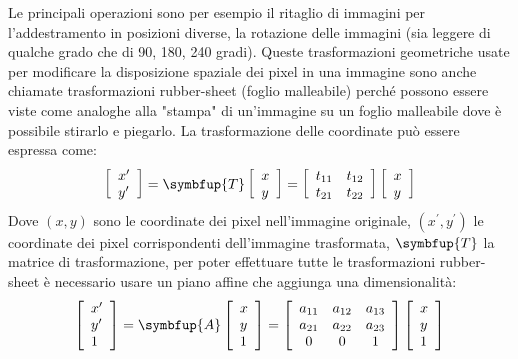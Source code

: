 Le principali operazioni sono per esempio  il ritaglio di immagini
per l'addestramento in posizioni diverse, la rotazione delle immagini (sia leggere di qualche grado che di 90, 180, 240 gradi). Queste trasformazioni geometriche usate per modificare la disposizione spaziale dei pixel in una 
immagine sono anche chiamate trasformazioni rubber-sheet (foglio malleabile) perché 
possono essere viste come analoghe alla "stampa" di un'immagine su un foglio malleabile dove è possibile stirarlo e piegarlo. La trasformazione delle coordinate può essere espressa come:
\[ \left[\begin{array}{l}x^{\prime} \\ y^{\prime}\end{array}\right]=\symbfup{T}\left[\begin{array}{l}x \\ y\end{array}\right]=\left[\begin{array}{ll}t_{11} & t_{12} \\ t_{21} & t_{22}\end{array}\right]\left[\begin{array}{l}x \\ y\end{array}\right] \]
Dove \((x,y)\)  sono le coordinate dei pixel nell'immagine originale, \((x^{\prime},y^{\prime})\)  le 
coordinate dei pixel corrispondenti dell'immagine trasformata, \(\symbfup{T}\) la matrice di trasformazione, per poter effettuare tutte le trasformazioni rubber-sheet è necessario usare un piano affine che aggiunga una dimensionalità:
\[ \left[\begin{array}{l}x^{\prime} \\ y^{\prime} \\ 1\end{array}\right]=\symbfup{A}\left[\begin{array}{l}x \\ y \\ 1\end{array}\right]=\left[\begin{array}{ccc}a_{11} & a_{12} & a_{13} \\ a_{21} & a_{22} & a_{23} \\ 0 & 0 & 1\end{array}\right]\left[\begin{array}{l}x \\ y \\ 1\end{array}\right] \]

